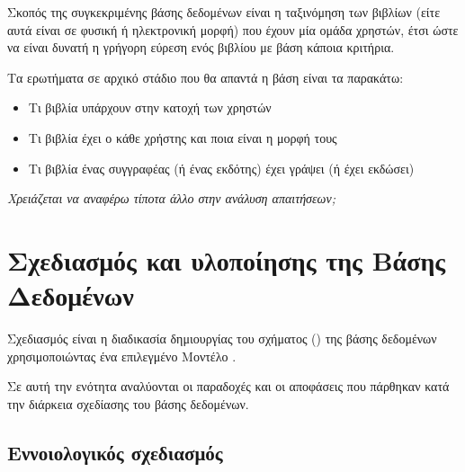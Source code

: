 \documentclass{assignment}
\begin{document}

Σκοπός της συγκεκριμένης βάσης δεδομένων είναι η ταξινόμηση των βιβλίων (είτε αυτά είναι σε φυσική ή ηλεκτρονική μορφή) που έχουν μία ομάδα χρηστών, έτσι ώστε να είναι δυνατή η γρήγορη εύρεση ενός βιβλίου με βάση κάποια κριτήρια. 

Τα ερωτήματα σε αρχικό στάδιο που θα απαντά η βάση είναι τα παρακάτω:

\begin{itemize}
  \item Τι βιβλία υπάρχουν στην κατοχή των χρηστών
  \item Τι βιβλία έχει ο κάθε χρήστης και ποια είναι η μορφή τους
  \item Τι βιβλία ένας συγγραφέας (ή ένας εκδότης) έχει γράψει (ή έχει εκδώσει)
\end{itemize}

\emph{Χρειάζεται να αναφέρω τίποτα άλλο στην ανάλυση απαιτήσεων;}





\section{Σχεδιασμός και υλοποίησης της Βάσης Δεδομένων}

Σχεδιασμός είναι η διαδικασία δημιουργίας του σχήματος () της βάσης δεδομένων χρησιμοποιώντας ένα επιλεγμένο Μοντέλο \cite{class_notes}.

Σε αυτή την ενότητα αναλύονται οι παραδοχές και οι αποφάσεις που πάρθηκαν κατά την διάρκεια σχεδίασης του βάσης δεδομένων.

\subsection{Εννοιολογικός σχεδιασμός}
\end{document}
